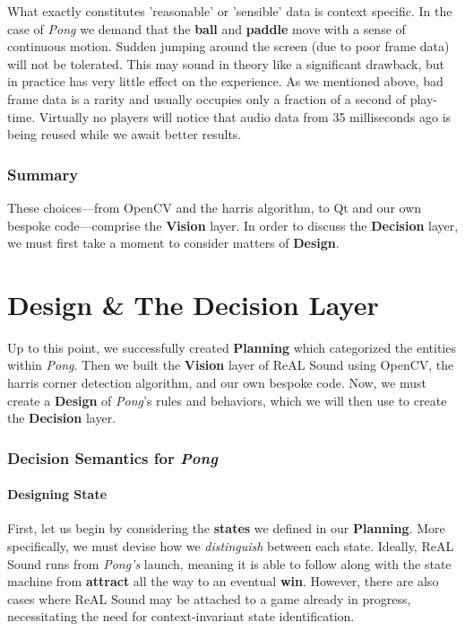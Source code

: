 \documentclass{report}
\newcommand{\rs}{ReAL Sound\xspace}
\newcommand{\plan}{\textbf{Planning}\xspace}
\newcommand{\design}{\textbf{Design}\xspace}
\newcommand{\state}[1]{\textbf{#1}}
\newcommand{\vision}{\textbf{Vision}\xspace}
\newcommand{\decision}{\textbf{Decision}\xspace}
\newcommand{\pad}{\textbf{paddle}\xspace}
\newcommand{\ball}{\textbf{ball}\xspace}
\begin{document}
What exactly constitutes 'reasonable' or 'sensible' data is context specific. In the case of \emph{Pong} we demand that the \ball and \pad move with a sense of continuous motion. Sudden jumping around the screen (due to poor frame data) will not be tolerated. This may sound in theory like a significant drawback, but in practice has very little effect on the experience. As we mentioned above, bad frame data is a rarity and usually occupies only a fraction of a second of play-time. Virtually no players will notice that audio data from 35 milliseconds ago is being reused while we await better results. 

\subsubsection{Summary}
These choices---from OpenCV and the harris algorithm, to Qt and our own bespoke code---comprise the \vision layer. In order to discuss the \decision layer, we must first take a moment to consider matters of \design.

\section{Design \& The Decision Layer}
Up to this point, we successfully created \plan which categorized the entities within \emph{Pong}. Then we built the \vision layer of \rs using OpenCV, the harris corner detection algorithm, and our own bespoke code. Now, we must create a \design of \emph{Pong}'s rules and behaviors, which we will then use to create the \decision layer. 

\subsubsection{Decision Semantics for \emph{Pong}}
\paragraph{Designing State}

First, let us begin by considering the \state{states} we defined in our \plan. More specifically, we must devise how we \emph{distinguish} between each state. Ideally, \rs runs from \emph{Pong's} launch, meaning it is able to follow along with the state machine from \state{attract} all the way to an eventual \state{win}. However, there are also cases where \rs may be attached to a game already in progress, necessitating the need for context-invariant state identification.
\end{document}
